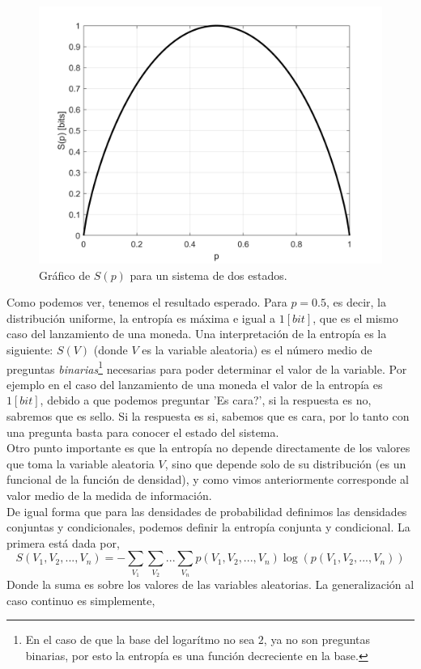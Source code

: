 \documentclass[executivepaper,12pt]{article}
\numberwithin{equation}{section}
\begin{document}
\begin{figure}[H]
	\begin{center}
		\includegraphics[scale=1]{entropyConc1}
	\end{center}
	\caption{Gráfico de $S(p)$ para un sistema de dos estados.}
	\label{fig-infor2}
\end{figure}
	
Como podemos ver, tenemos el resultado esperado. Para $p=0.5$, es decir, la distribución uniforme, la entropía es máxima e igual a $1 [bit]$, que es el mismo caso del lanzamiento de una moneda. Una interpretación de la entropía es la siguiente: $S(V)$ (donde $V$ es la variable aleatoria) es el número medio de preguntas \textit{binarias}\footnote{En el caso de que la base del logarítmo no sea $2$, ya no son preguntas binarias, por esto la entropía es una función decreciente en la base.} necesarias para poder determinar el valor de la variable. Por ejemplo en el caso del lanzamiento de una moneda el valor de la entropía es $1 [bit]$, debido a que podemos preguntar 'Es cara?', si la respuesta es no, sabremos que es sello. Si la respuesta es si, sabemos que es cara, por lo tanto con una pregunta basta para conocer el estado del sistema.\\
Otro punto importante es que la entropía no depende directamente de los valores que toma la variable aleatoria $V$, sino que depende solo de su distribución (es un funcional de la función de densidad), y como vimos anteriormente corresponde al valor medio de la medida de información. \\
De igual forma que para las densidades de probabilidad definimos las densidades conjuntas y condicionales, podemos definir la entropía conjunta y condicional. La primera está dada por,
\begin{equation*}
	S(V_1,V_2,...,V_n)=-\sum_{V_1} \sum_{V_2}...\sum_{V_n} p(V_1,V_2,...,V_n)\log(p(V_1,V_2,...,V_n))
\end{equation*}
Donde la suma es sobre los valores de las variables aleatorias. La generalización al caso continuo es simplemente, 
\end{document}
